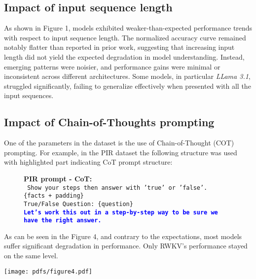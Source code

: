 \documentclass[11pt]{article}
\begin{document}
\subsection{Impact of input sequence length}

As shown in Figure 1, models exhibited weaker-than-expected performance trends with respect to input sequence length. The normalized accuracy curve remained notably flatter than reported in prior work, suggesting that increasing input length did not yield the expected degradation in model understanding. Instead, emerging patterns were noisier, and performance gains were minimal or inconsistent across different architectures. Some models, in particular \textit{LLama 3.1}, struggled significantly, failing to generalize effectively when presented with all the input sequences.


\subsection{Impact of Chain-of-Thoughts prompting}

One of the parameters in the dataset is the use of Chain-of-Thought (COT) \citep{wei2023chainofthoughtpromptingelicitsreasoning} prompting. For example, in the PIR dataset the following structure was used with highlighted part indicating CoT prompt structure:


\begin{figure}[H]
    \begin{framed}
        \textbf{PIR prompt - CoT:}\\
        \small
        \texttt{
        Show your steps then answer with 'true' or 'false'.\\
        \{facts + padding\}\\
        True/False Question: \{question\}\\ 
        \textbf{\textcolor{blue}{Let's work this out in a step-by-step way to be sure we have the right answer.}}
        }
        \normalsize
    \end{framed}
\end{figure}

As can be seen in the Figure 4, and contrary to the expectations, most models suffer significant degradation in performance. Only RWKV's performance stayed on the same level.  

\texttt{[image: pdfs/figure4.pdf]}
\end{document}
